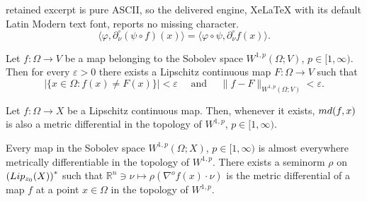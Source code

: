 \documentclass[10pt,a4paper]{amsart}
\begin{document}
retained excerpt is pure ASCII, so the delivered engine, XeLaTeX with its default Latin Modern text font, reports no missing character.
\begin{equation}\label{eq:comisometric}
  \langle \varphi, \partial^\circ_\nu (\psi\circ f)(x) \rangle =   \langle \varphi\circ\psi, \partial^\circ_\nu f(x) \rangle.
\end{equation}

\begin{lem}\label{lemma:lipapprox}
Let $f:\Omega\to V$ be a map belonging to the Sobolev space $W^{1,p}(\Omega; V)$, $p\in [1,\infty)$.
Then for every $\varepsilon>0$ there exists a Lipschitz continuous map $F:\Omega\to V$ such that
\[
|\{x\in\Omega \colon f(x) \ne F(x)\} | < \varepsilon \quad\text{ and }\quad \|f - F \|_{W^{1,p}(\Omega; V)}<\varepsilon.
\]
\end{lem}

\begin{lem}\label{lemma:LipDiff}
Let $f:\Omega\to X$ be a Lipschitz continuous map.
Then, whenever it exists, $\textnormal{md}(f, x)$ is also a metric differential in the topology of $W^{1,p}$, $p\in[1,\infty)$.
\end{lem}

\begin{thm}\label{theorem:metricSob}
Every map in the Sobolev space 
$W^{1,p}(\Omega; X)$, $p\in [1, \infty)$
is almost everywhere metrically differentiable in the topology of $W^{1,p}$.
There exists a seminorm $\rho$ on $\left(\textnormal{Lip}_{z_0}(X)\right)^*$ such that  
  $\mathbb R^n \ni \nu\mapsto \rho(\nabla^of(x)\cdot\nu ) $
is the metric differential of a map $f$
at a point $x\in\Omega$ in the topology of $W^{1,p}$. 
\end{thm}
\end{document}
